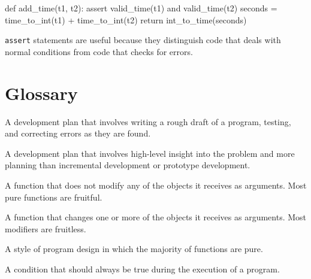 
\beforeverb
\begin{pycode}
def add_time(t1, t2):
    assert valid_time(t1) and valid_time(t2)
    seconds = time_to_int(t1) + time_to_int(t2)
    return int_to_time(seconds)
\end{pycode}
\afterverb
%
{\tt assert} statements are useful because they distinguish
code that deals with normal conditions from code
that checks for errors.


\section{Glossary}
	
\begin{vocabulary} A development plan that involves
writing a rough draft of a program, testing, and correcting errors as
they are found.
\end{vocabulary}
	
\begin{vocabulary} A development plan that involves
high-level insight into the problem and more planning than incremental
development or prototype development.
\end{vocabulary}
	
\begin{vocabulary} A function that does not modify any of the objects it
receives as arguments.  Most pure functions are fruitful.
\end{vocabulary}
	
\begin{vocabulary}[modifier:] A function that changes one or more of the objects it
receives as arguments.  Most modifiers are fruitless.
\end{vocabulary}
	
\begin{vocabulary} A style of program design in which the
majority of functions are pure.
\end{vocabulary}
	
\begin{vocabulary}[invariant:] A condition that should always be true during the
execution of a program.
\end{vocabulary}


